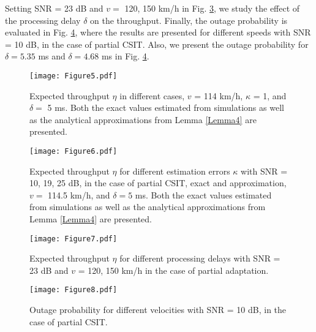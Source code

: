 Setting SNR = 23 dB and $v = $ 120, 150 km/h in Fig. \ref{fig_Figure7},  we study the effect of the processing delay $\delta$ on the throughput. Finally, the outage probability is evaluated in Fig. \ref{fig_Figure8}, where the results are presented for different speeds with SNR = 10 dB, in the case of partial CSIT. Also, we present  the outage probability for $\delta = 5.35$ ms and $\delta = 4.68$ ms in Fig.  \ref{fig_Figure8}. 


\begin{figure}
\centering
  \texttt{[image: Figure5.pdf]}\\
\caption{Expected throughput $\eta$ in different cases, $v$ = 114 km/h, $\kappa$ = 1, and $\delta = $ 5 ms. Both the exact values estimated from  simulations as well as the analytical approximations from Lemma \ref{Lemma4} are presented.}\label{fig_Figure5}
\end{figure}

\begin{figure}
\centering
  \texttt{[image: Figure6.pdf]}\\
\caption{Expected throughput $\eta$ for different estimation errors $\kappa$ with SNR = 10, 19, 25 dB, in the case of partial CSIT, exact and approximation,  $v = $  114.5 km/h, and $\delta = 5$ ms. Both the exact values estimated from simulations as well as the analytical approximations from Lemma \ref{Lemma4} are presented.}\label{fig_Figure6}
\end{figure}


\begin{figure}
\centering
  \texttt{[image: Figure7.pdf]}\\
\caption{Expected throughput $\eta$ for different processing delays with SNR = 23 dB and $v$ = 120, 150 km/h in the case of partial adaptation. }\label{fig_Figure7}

\end{figure}

\begin{figure}
\centering
  \texttt{[image: Figure8.pdf]}\\
\caption{Outage probability for different velocities with SNR = 10 dB, in the case of partial CSIT.}\label{fig_Figure8}

\end{figure}




